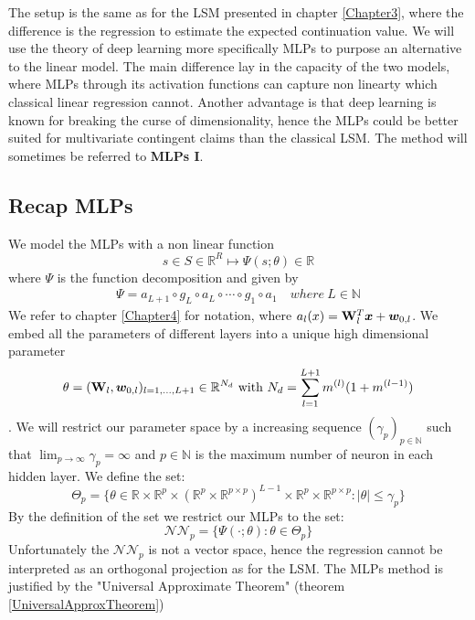 The setup is the same as for the LSM presented in chapter \ref{Chapter3}, where the difference is the regression to estimate the expected continuation value. We will use the theory of deep learning more specifically MLPs to purpose an alternative to the linear model. The main difference lay in the capacity of the two models, where MLPs through its activation functions can capture non linearty which classical linear regression cannot. Another advantage is that deep learning is known for breaking the curse of dimensionality, hence the MLPs could be better suited for multivariate contingent claims than the classical LSM. The method will sometimes be referred to \textbf{MLPs I}.

\subsection{Recap MLPs}
We model the MLPs with a non linear function 
$$s \in S \in \mathbb{R}^R \mapsto \Psi(s;\theta) \in \mathbb{R}$$
where $\Psi$ is the function decomposition and given by
\begin{align*}
\Psi = a_{L+1} \circ g_L \circ a_{L} \circ \cdots \circ g_1 \circ a_1 \quad where \ L\in \mathbb{N}
\end{align*}
We refer to chapter \ref{Chapter4} for notation, where $a_l(x)=\mathbf{W}_l^T \bm{x} + \bm{w}_{0,l}$. We embed all the parameters of different layers into a unique high dimensional parameter
$$\theta=(\mathbf{W}_l, \bm{w}_{0,l})_{l=1,\ldots,L+1} \in \mathbb{R}^{N_d} \text{ with } N_d=\sum_{l=1}^{L+1} m^{(l)} (1+ m^{(l-1)})$$. 
We will restrict our parameter space by a increasing sequence $(\gamma_p)_{p\in \mathbb{N}}$ such that $\lim_{p\to \infty} \gamma_p=\infty$ and $p\in \mathbb{N}$ is the maximum number of neuron in each hidden layer. We define the set:
$$\Theta_p = \{ \theta \in \mathbb{R} \times \mathbb{R}^p \times (\mathbb{R}^p \times \mathbb{R}^{p \times p})^{L-1} \times \mathbb{R}^{p} \times \mathbb{R}^{p \times p} : |\theta| \leq \gamma_p \}$$
By the definition of the set we restrict our MLPs to the set:
$$\mathcal{N} \mathcal{N}_p= \{ \Psi(\cdot;\theta) : \theta \in \Theta_p \}$$
Unfortunately the $\mathcal{N} \mathcal{N}_p$ is not a vector space, hence the regression cannot be interpreted as an orthogonal projection as for the LSM. The MLPs method is justified by the "Universal Approximate Theorem" (theorem \ref{UniversalApproxTheorem})

